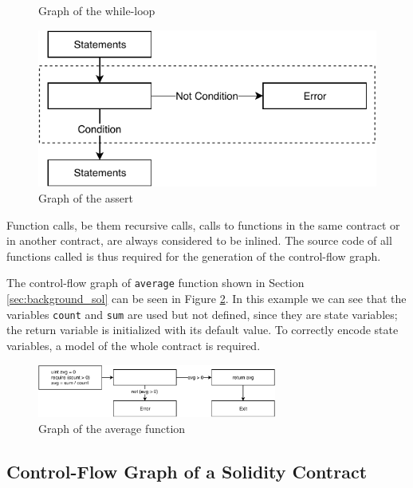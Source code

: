 \begin{figure}[ht]
\begin{minipage}[h]{0.45\textwidth}
    \caption{Graph of the while-loop}
    \label{fig:cfg_while}
  \end{minipage}
  \hfill
  \begin{minipage}[h]{0.45\textwidth}
  	\centering
    \includegraphics[width=\textwidth]{images/assert}
    \caption{Graph of the assert}
    \label{fig:cfg_assert}
  \end{minipage}
\end{figure}

Function calls, be them  recursive calls, calls to functions in the same contract or in another contract, are always considered to be inlined. The source code of all functions called is thus required for the generation of the control-flow graph.

The control-flow graph of \texttt{average} function shown in Section \ref{sec:background_sol} can be seen in Figure \ref{fig:cfg_average}. In this example we can see that the variables \texttt{count} and \texttt{sum} are used but not defined, since they are state variables; the return variable is initialized with its default value. To correctly encode state variables, a model of the whole contract is required.

\begin{figure}[ht]
	\centering
	\includegraphics[width=0.7\textwidth]{images/average}
	\caption{Graph of the average function}
	\label{fig:cfg_average}
\end{figure}


\subsection{Control-Flow Graph of a Solidity Contract} \label{sec:sol_cfg_con}

